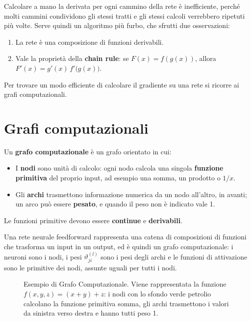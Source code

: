 Calcolare a mano la derivata per ogni cammino della rete è inefficiente, perché molti cammini condividono gli stessi tratti e gli stessi calcoli verrebbero ripetuti più volte. Serve quindi un algoritmo più furbo, che sfrutti due osservazioni:
\begin{enumerate}
    \item La rete è una composizione di funzioni derivabili.
    \item Vale la proprietà della \textbf{chain rule}: se $F(x) = f(g(x))$, allora $F'(x) = g'(x)\,f'\big(g(x)\big)$.
\end{enumerate}
Per trovare un modo efficiente di calcolare il gradiente su una rete si ricorre ai grafi computazionali.

\section{Grafi computazionali}
\begin{definizione}
Un \textbf{grafo computazionale} è un grafo orientato in cui:
\begin{itemize}
    \item I \textbf{nodi} sono unità di calcolo: ogni nodo calcola una singola \textbf{funzione primitiva} del proprio input, ad esempio una somma, un prodotto o $1/x$.
    \item Gli \textbf{archi} trasmettono informazione numerica da un nodo all'altro, in avanti; un arco può essere \textbf{pesato}, e quando il peso non è indicato vale 1.
\end{itemize}
Le funzioni primitive devono essere \textbf{continue} e \textbf{derivabili}.
\end{definizione}

Una rete neurale feedforward rappresenta una catena di composizioni di funzioni che trasforma un input in un output, ed è quindi un grafo computazionale: i neuroni sono i nodi, i pesi $\vartheta_{ji}^{(l)}$ sono i pesi degli archi e le funzioni di attivazione sono le primitive dei nodi, assunte uguali per tutti i nodi.

\begin{figure}[htbp]
\centering
{}
\caption{Esempio di Grafo Computazionale. Viene rappresentata la funzione $f(x,y,z) = (x+y)+z$: i nodi con lo sfondo verde petrolio calcolano la funzione primitiva somma, gli archi trasmettono i valori da sinistra verso destra e hanno tutti peso 1.}
\label{fig:grafo-somma}
\end{figure}

